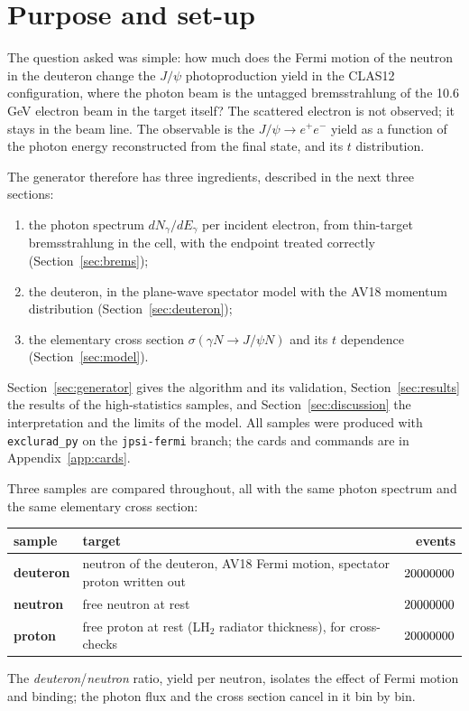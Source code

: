 \documentclass[11pt,a4paper]{article}
\newcommand{\Eg}{E_\gamma}
\newcommand{\jpsi}{J/\psi}
\begin{document}
\tableofcontents

\section{Purpose and set-up}

The question asked was simple: how much does the Fermi motion of the neutron in the deuteron change the
$\jpsi$ photoproduction yield in the CLAS12 configuration, where the photon beam is the untagged
bremsstrahlung of the 10.6\,GeV electron beam in the target itself?  The scattered electron is not
observed; it stays in the beam line.  The observable is the $\jpsi\to e^+e^-$ yield as a function of
the photon energy reconstructed from the final state, and its $t$ distribution.

The generator therefore has three ingredients, described in the next three sections:
\begin{enumerate}
\item the photon spectrum $dN_\gamma/d\Eg$ per incident electron, from thin-target bremsstrahlung in
      the cell, with the endpoint treated correctly (Section~\ref{sec:brems});
\item the deuteron, in the plane-wave spectator model with the AV18 momentum distribution
      (Section~\ref{sec:deuteron});
\item the elementary cross section $\sigma(\gamma N\to\jpsi N)$ and its $t$ dependence
      (Section~\ref{sec:model}).
\end{enumerate}
Section~\ref{sec:generator} gives the algorithm and its validation, Section~\ref{sec:results} the
results of the high-statistics samples, and Section~\ref{sec:discussion} the interpretation and the
limits of the model.  All samples were produced with \texttt{exclurad\_py} on the \texttt{jpsi-fermi}
branch; the cards and commands are in Appendix~\ref{app:cards}.

Three samples are compared throughout, all with the same photon spectrum and the same elementary cross
section:
\begin{center}
\begin{tabular}{lp{8.5cm}r}
\toprule
sample & target & events \\
\midrule
\textbf{deuteron} & neutron of the deuteron, AV18 Fermi motion, spectator proton written out & $20000000$ \\
\textbf{neutron}  & free neutron at rest & $20000000$ \\
\textbf{proton}   & free proton at rest (LH$_2$ radiator thickness), for cross-checks & $20000000$ \\
\bottomrule
\end{tabular}
\end{center}
The \emph{deuteron}/\emph{neutron} ratio, yield per neutron, isolates the effect of Fermi motion and
binding; the photon flux and the cross section cancel in it bin by bin.
\end{document}
